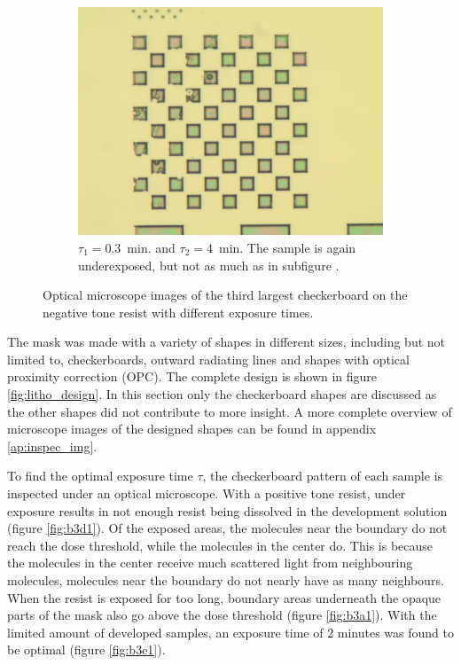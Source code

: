 \begin{figure}[!b]
\begin{subfigure}[t]{0.3\linewidth}
    \end{subfigure}
    \hfill
    \begin{subfigure}[t]{0.3\linewidth}
        \centering
        \includegraphics[width=\textwidth]{data/b2i1.jpg}
	    \caption{$\tau_1 = 0.3$~min. and $\tau_2 = 4$~min. The sample is again underexposed, but not as much as in subfigure .}
	    \label{fig:b2i1}
    \end{subfigure}
    \caption{Optical microscope images of the third largest checkerboard on the negative tone resist with different exposure times.}
    \label{fig:optical-neg}
\end{figure}

The mask was made with a variety of shapes in different sizes, including but not limited to, checkerboards, outward radiating lines and shapes with optical proximity correction (OPC). The complete design is shown in figure \ref{fig:litho_design}. In this section only the checkerboard shapes are discussed as the other shapes did not contribute to more insight. A more complete overview of microscope images of the designed shapes can be found in appendix \ref{ap:inspec_img}.

To find the optimal exposure time $\tau$, the checkerboard pattern of each sample is inspected under an optical microscope. With a positive tone resist, under exposure results in not enough resist being dissolved in the development solution (figure \ref{fig:b3d1}). Of the exposed areas, the molecules near the boundary do not reach the dose threshold, while the molecules in the center do. This is because the molecules in the center receive much scattered light from neighbouring molecules, molecules near the boundary do not nearly have as many neighbours. When the resist is exposed for too long, boundary areas underneath the opaque parts of the mask also go above the dose threshold (figure \ref{fig:b3a1}). With the limited amount of developed samples, an exposure time of 2 minutes was found to be optimal (figure \ref{fig:b3e1}).

